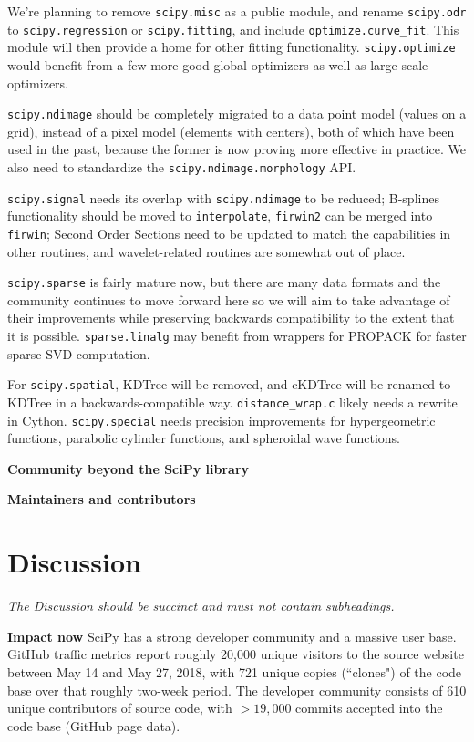 \documentclass[fleqn,10pt]{wlscirep}
\begin{document}
We're planning to remove \texttt{scipy.misc} as a public module, and
rename \texttt{scipy.odr} to \texttt{scipy.regression} or
\texttt{scipy.fitting}, and include \texttt{optimize.curve\_fit}. This 
module will then provide a home for other fitting functionality.
\texttt{scipy.optimize} would benefit from a few more good global optimizers 
as well as large-scale optimizers.

\texttt{scipy.ndimage} should be completely migrated to a data point
model (values on a grid), instead of a pixel model (elements with centers),
both of which have been used in the past, because the former is now
proving more effective in practice. We also need to standardize the
\texttt{scipy.ndimage.morphology} API.

\texttt{scipy.signal} needs its overlap with \texttt{scipy.ndimage}
to be reduced; B-splines functionality should be moved to \texttt{interpolate},
\texttt{firwin2} can be merged into \texttt{firwin}; Second Order Sections need
to be updated to match the capabilities in other routines, and wavelet-related
routines are somewhat out of place.

\texttt{scipy.sparse} is fairly mature now, but there are many data
formats and the community continues to move forward here so we will aim
to take advantage of their improvements while preserving backwards
compatibility to the extent that it is possible. \texttt{sparse.linalg}
may benefit from wrappers for PROPACK for faster sparse SVD computation.

For \texttt{scipy.spatial}, KDTree will be removed, and cKDTree will be 
renamed to KDTree in a backwards-compatible way. \texttt{distance\_wrap.c} 
likely needs a rewrite in Cython. \texttt{scipy.special} needs precision
improvements for hypergeometric functions, parabolic cylinder functions,
and spheroidal wave functions.




\textbf{Community beyond the SciPy library}

\textbf{Maintainers and contributors}


\section*{Discussion}

\textit{The Discussion should be succinct and must not contain subheadings.}

\textbf{Impact now}
SciPy has a strong developer community and a massive user base. GitHub
traffic metrics report roughly 20,000 unique visitors to the source
website between May 14 and May 27, 2018, with 721 unique copies (``clones")
of the code base over that roughly two-week period. The developer community
consists of 610 unique contributors of source code, with $>19,000$ commits
accepted into the code base (GitHub page data).
\end{document}
